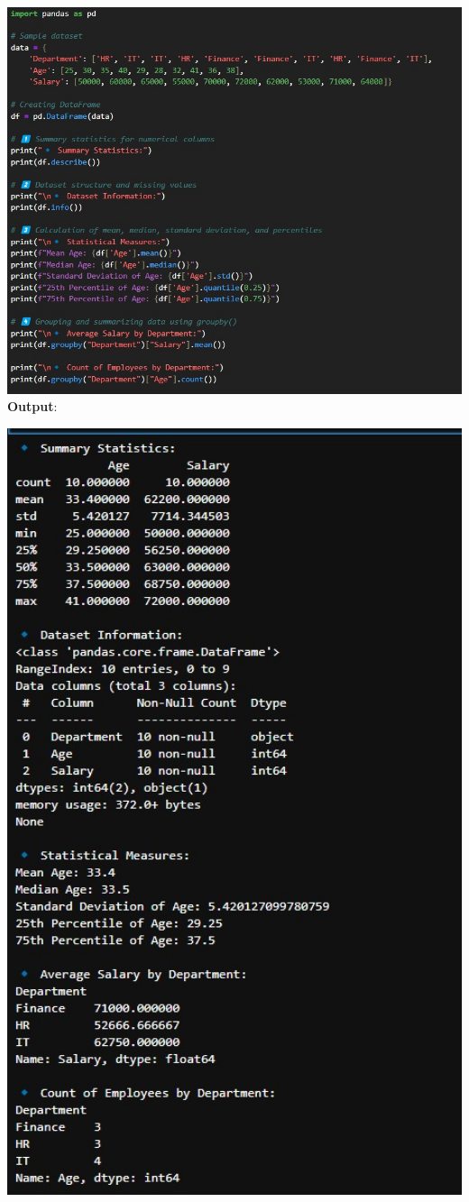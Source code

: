 \documentclass{article}
\begin{document}
\includegraphics[width=17cm,height=16
cm]{Summary.jpeg}
\newpage
\textbf{Output}:

\includegraphics[width=14cm,height=18
cm]{Summary_Output.jpeg}
\end{document}
